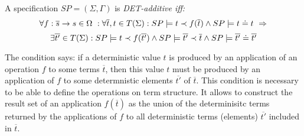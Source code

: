 \documentclass[10pt]{article}
\begin{document}
\begin{definition} \cite{hussmann}
A specification $SP=(\Sigma,\Gamma)$ is \em{DET-additive} iff:
\[ \forall f:\overline{s} \to s \in \Omega\ : \forall \overline{t}, t \in
T(\Sigma): SP \models t \prec f(\overline{t}) \land SP \models t \mathrel{\dot{=} } t\ \Rightarrow 
\]
%
\[ \exists \overline{t'} \in T(\Sigma): SP \models t \prec f(\overline{t'})
\land SP \models \overline{t'} \prec \overline{t} \land 
 SP \models \overline{t'} \mathrel{\dot{=} } \overline{t'} 
\]
\end{definition}
The condition says: if a deterministic value $t$ is produced by an application of
an operation $f$ to some terms $\overline t$, then this value $t$ must be
produced by an application of $f$ to some determnistic elements
$\overline{t'}$ of $\overline t$.
This condition is necessary to be able to define the operations on term
structure. 
It allows to construct the result set of an application $f(\overline t)$ as
the union of the determinisitc terms returned by the applications of $f$ to
all deterministic terms (elements) $\overline{t'}$ included in $\overline{t}$.
\end{document}
